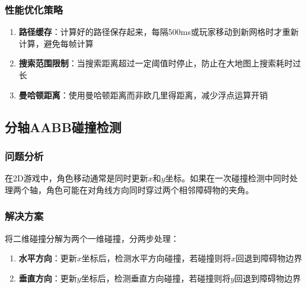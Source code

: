\documentclass[12pt,a4paper]{article}
\begin{document}
\subsubsection{性能优化策略}

\begin{enumerate}[leftmargin=2em]
    \item \textbf{路径缓存}：计算好的路径保存起来，每隔500ms或玩家移动到新网格时才重新计算，避免每帧计算
    \item \textbf{搜索范围限制}：当搜索距离超过一定阈值时停止，防止在大地图上搜索耗时过长
    \item \textbf{曼哈顿距离}：使用曼哈顿距离而非欧几里得距离，减少浮点运算开销
\end{enumerate}

\subsection{分轴AABB碰撞检测}

\subsubsection{问题分析}

在2D游戏中，角色移动通常是同时更新$x$和$y$坐标。如果在一次碰撞检测中同时处理两个轴，角色可能在对角线方向同时穿过两个相邻障碍物的夹角。

\subsubsection{解决方案}

将二维碰撞分解为两个一维碰撞，分两步处理：

\begin{enumerate}[leftmargin=2em]
    \item \textbf{水平方向}：更新$x$坐标后，检测水平方向碰撞，若碰撞则将$x$回退到障碍物边界
    \item \textbf{垂直方向}：更新$y$坐标后，检测垂直方向碰撞，若碰撞则将$y$回退到障碍物边界
\end{enumerate}
\end{document}
